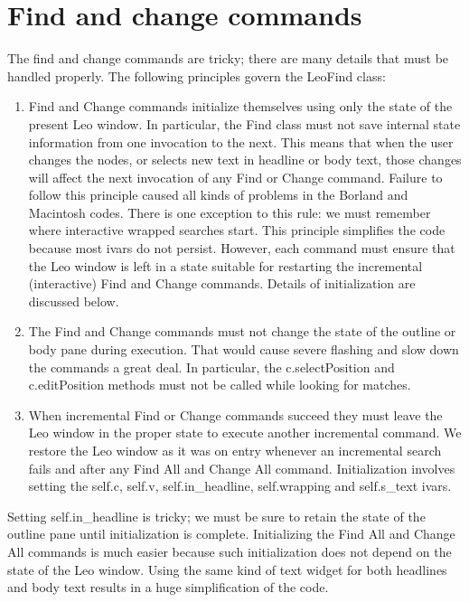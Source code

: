 \documentclass[a4paper,10pt,english]{sphinxmanual}
\begin{document}
\section{Find and change commands}
\label{theory:find-and-change-commands}
The find and change commands are tricky; there are many details that must be
handled properly. The following principles govern the LeoFind class:
\begin{enumerate}
\item {} 
Find and Change commands initialize themselves using only the state of the
present Leo window. In particular, the Find class must not save internal
state information from one invocation to the next. This means that when the
user changes the nodes, or selects new text in headline or body text, those
changes will affect the next invocation of any Find or Change command.
Failure to follow this principle caused all kinds of problems in the Borland
and Macintosh codes. There is one exception to this rule: we must remember
where interactive wrapped searches start. This principle simplifies the code
because most ivars do not persist. However, each command must ensure that
the Leo window is left in a state suitable for restarting the incremental
(interactive) Find and Change commands. Details of initialization are
discussed below.

\item {} 
The Find and Change commands must not change the state of the outline or body
pane during execution. That would cause severe flashing and slow down the
commands a great deal. In particular, the c.selectPosition and c.editPosition
methods must not be called while looking for matches.

\item {} 
When incremental Find or Change commands succeed they must leave the Leo
window in the proper state to execute another incremental command. We
restore the Leo window as it was on entry whenever an incremental search
fails and after any Find All and Change All command. Initialization involves
setting the self.c, self.v, self.in\_headline, self.wrapping and
self.s\_text ivars.

\end{enumerate}

Setting self.in\_headline is tricky; we must be sure to retain the state of the
outline pane until initialization is complete. Initializing the Find All and
Change All commands is much easier because such initialization does not depend
on the state of the Leo window. Using the same kind of text widget for both
headlines and body text results in a huge simplification of the code.
\end{document}
